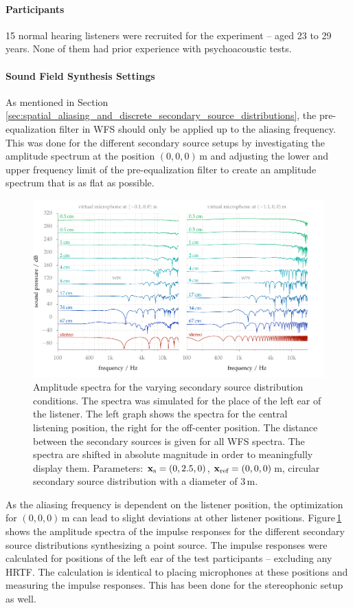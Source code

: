 \paragraph{Participants}
%
15 normal hearing listeners were recruited for the experiment -- aged 23 to 29 years. None of
them had prior experience with psychoacoustic tests.

\paragraph{Sound Field Synthesis Settings}
%
As mentioned in
Section\,\ref{sec:spatial_aliasing_and_discrete_secondary_source_distributions},
the pre-\-equali\-zat\-ion filter in \ac{WFS} should only be applied up to the aliasing frequency.
This was done for the different secondary source setups by investigating the
amplitude spectrum at the position $(0,0,0)$\,m and adjusting the lower and
upper frequency limit of the pre-\-equali\-zat\-ion filter to create an amplitude
spectrum that is as flat as possible.
%
\begin{figure}
    \centering
    \includegraphics{fig5_08/fig5_08}
    \caption{Amplitude spectra for the varying secondary source distribution
    conditions. The spectra was simulated for the place of the left ear of
    the listener. The left graph shows the spectra
    for the central listening position, the right for the off-center position.
    The distance between the secondary sources is given for all \ac{WFS}
    spectra.
    The spectra are shifted in absolute magnitude in order to meaningfully display
    them.
    Parameters: $\mathbf{x}_\text{s} = (0,2.5,0)$, $\mathbf{x}_\text{ref} = (0,0,0)$\,m, circular secondary
    source distribution with a diameter of $3$\,m.
    }
    \label{fig:coloration_freq_response}
    \vspace{-0.5cm}
\end{figure}
%
As the aliasing frequency is dependent on the listener position, the optimization
for $(0,0,0)$\,m can lead to slight deviations at other listener positions.
Figure\,\ref{fig:coloration_freq_response} shows the amplitude spectra of the
impulse responses for the different secondary source distributions synthesizing
a point source. The impulse responses were calculated for positions of the left
ear of the test participants -- excluding any \ac{HRTF}.
The calculation is identical to placing microphones
at these positions and measuring the impulse responses.
This has been done for the stereophonic setup as well.

